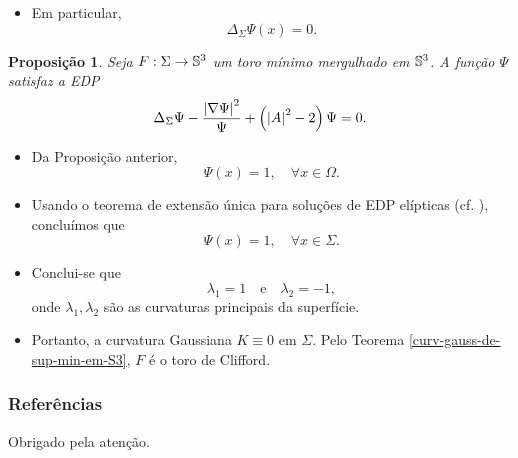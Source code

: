 \documentclass[10pt,a4paper]{beamer}
\newtheorem{proposicao}{Proposição}
\theoremstyle{definition}
\begin{document}
\begin{frame}	

	\begin{itemize}
		\item Em particular,
		\begin{equation*}
		\Delta_{\Sigma} \Psi(x) = 0.
		\end{equation*}
	\end{itemize}	
	
	\pause

	\begin{proposicao}
		Seja $F: \Sigma \rightarrow \mathbb{S}^3$ um toro mínimo mergulhado em $\mathbb{S}^3$. A função $\Psi$ satisfaz a EDP
		\begin{equation*}
			\Delta_{\Sigma} \Psi - \frac{\left| \nabla \Psi \right|^2}{\Psi} + \left( \left| A \right|^2 - 2 \right) \Psi = 0.
		\end{equation*}
	\end{proposicao}

	\pause
	
	\begin{itemize}
		\item Da Proposição anterior,
		\[ \Psi(x) = 1, \quad \forall x \in \Omega. \]
	\end{itemize}

\end{frame}
	
\begin{frame}	
	
	\begin{itemize}
		\item Usando o teorema de extensão única para soluções de EDP elípticas (cf. \cite{Aronszajn1957}), concluímos que
		\[ \Psi(x) = 1, \quad \forall x \in \Sigma. \]
		
		\pause
		
		\item Conclui-se que
		\[ \lambda_1 = 1 \quad \text{e} \quad \lambda_2 = -1, \]
		onde $\lambda_1,\lambda_2$ são as curvaturas principais da superfície.
		
		\pause
		
		\item 	Portanto, a curvatura Gaussiana $K \equiv 0$ em $\Sigma$. Pelo Teorema \ref{curv-gauss-de-sup-min-em-S3}, $F$ é o toro de Clifford.
	\end{itemize}
	
	
	
	


\end{frame}



\begin{frame}[allowframebreaks]
	\frametitle{Referências}
	
\end{frame}


\begin{frame}
	\begin{center}
		\huge Obrigado pela atenção.
	\end{center}
\end{frame}
\end{document}
